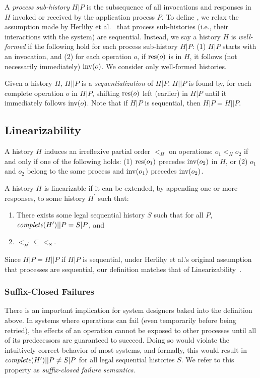 A \textit{process sub-history} $H|P$ is the subsequence of all invocations and responses
in $H$ invoked or received by the application process $P$. To define \MDL{}, we relax the
assumption made by Herlihy et al.~\cite{herlihy1990linearizability} that process sub-histories
(i.e., their interactions with the system) are sequential. Instead, we say a history $H$
is \textit{well-formed} if the following hold for each process sub-history $H|P$:
(1) $H|P$ starts with an invocation, and (2) for each operation $o$, if $\operatorname{res}(o)$ is in $H$,
it follows (not necessarily immediately) $\operatorname{inv}(o)$. We consider only well-formed histories.

Given a history $H$, $H||P$ is a \textit{sequentialization} of $H|P$. $H||P$ is
found by, for each complete operation $o$ in $H|P$, shifting $\operatorname{res}(o)$ left (earlier) in $H|P$
until it immediately follows $\operatorname{inv}(o)$. Note that if $H|P$ is sequential, then $H|P = H||P$.

\subsection{\Multidispatch{} Linearizability}
\label{sec:mdl:def}

A history $H$ induces an irreflexive partial order $<_H$ on operations: $o_1 <_H o_2$ if and only if
one of the following holds: (1) $\operatorname{res}(o_1)$ precedes $\operatorname{inv}(o_2)$ in $H$, or (2) $o_1$ and $o_2$
belong to the same process and $\operatorname{inv}(o_1)$ precedes $\operatorname{inv}(o_2)$.

A history $H$ is \multidispatch{} linearizable if it can be extended, by appending one or more
responses, to some history $H^\prime$ such that:
\begin{enumerate}
    \item There exists some legal sequential history $S$ such that for all $P$,
    $\operatorname*{\textit{complete}}(H^\prime)||P = S|P$, and
    \item $<_{H^\prime} \subseteq <_S$.
\end{enumerate}

Since $H|P = H||P$ if $H|P$ is sequential, under Herlihy et al.'s original assumption
that processes are sequential, our definition matches that of
Linearizability~\cite{herlihy1990linearizability}.

\subsubsection{Suffix-Closed Failures}
\label{sec:mdl:def:failures}

There is an important implication for system designers baked into the definition above.
In systems where operations can fail (even temporarily before being retried), the effects
of an operation cannot be exposed to other processes until all of its predecessors are
guaranteed to succeed. Doing so would violate the intuitively correct behavior of most
systems, and formally, this would result in $\operatorname*{\textit{complete}}(H^\prime)||P \neq S|P$ for all legal
sequential histories $S$. We refer to this property as \textit{suffix-closed failure semantics}.

